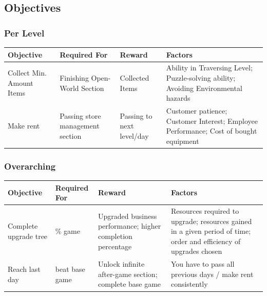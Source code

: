 \documentclass[10pt,a4paper]{article}
\begin{document}
\subsection{Objectives}
\subsubsection{Per Level}
\begin{tabularx}{12cm}{|>{\raggedright\arraybackslash}X|>{\raggedright\arraybackslash}X|>{\raggedright\arraybackslash}X|>{\raggedright\arraybackslash}X|}
\hline
\textbf{Objective} & \textbf{Required For} & \textbf{Reward} & \textbf{Factors}\\
\hline
Collect Min. Amount Items & Finishing Open-World Section & Collected Items & Ability in Traversing Level; Puzzle-solving ability; Avoiding Environmental hazards \\
\hline
Make rent & Passing store management section & Passing to next level/day & Customer patience; Customer Interest; Employee Performance; Cost of bought equipment\\
\hline
\end{tabularx}
\subsubsection{Overarching}
\begin{tabularx}{12cm}{|>{\raggedright\arraybackslash}X|>{\raggedright\arraybackslash}X|>{\raggedright\arraybackslash}X|>{\raggedright\arraybackslash}X|}
\hline
\textbf{Objective} & \textbf{Required For} & \textbf{Reward} & \textbf{Factors}\\
\hline
Complete upgrade tree & 100\% game & Upgraded business performance; higher completion percentage & Resources required to upgrade; resources gained in a given period of time; order and efficiency of upgrades chosen \\
\hline
Reach last day & beat base game & Unlock infinite after-game section; complete base game & You have to pass all previous days / make rent consistently\\
\hline
\end{tabularx}
\end{document}
